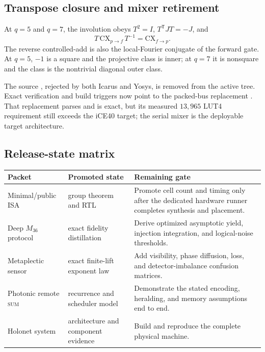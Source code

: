 \subsection{Transpose closure and mixer retirement}
At $q=5$ and $q=7$, the involution obeys $T^2=I$, $T^{\mathsf T}JT=-J$, and
\[
 T\,\mathrm{CX}_{p\to f}\,T^{-1}=\mathrm{CX}_{f\to p}.
\]
The reverse controlled-add is also the local-Fourier conjugate of the forward gate. At
$q=5$, $-1$ is a square and the projective class is inner; at $q=7$ it is nonsquare and
the class is the nontrivial diagonal outer class.

The source , rejected by both Icarus and Yosys, is removed
from the active tree. Exact verification and build triggers now point to the packed-bus
replacement . That replacement parses and
is exact, but its measured $13{,}965$ LUT4 requirement still exceeds the iCE40 target; the
serial mixer is the deployable target architecture.

\subsection{Release-state matrix}
\begin{center}
\begin{tabular}{@{}p{3.6cm}p{2.8cm}p{6.6cm}@{}}
\toprule
\textbf{Packet} & \textbf{Promoted state} & \textbf{Remaining gate}\\
\midrule
Minimal/public ISA & group theorem and RTL & Promote cell count and timing only after the
dedicated hardware runner completes synthesis and placement.\\
Deep $M_{36}$ protocol & exact fidelity distillation & Derive optimized asymptotic yield,
injection integration, and logical-noise thresholds.\\
Metaplectic sensor & exact finite-lift exponent law & Add visibility, phase diffusion,
loss, and detector-imbalance confusion matrices.\\
Photonic remote \textsc{sum} & recurrence and scheduler model & Demonstrate the stated
encoding, heralding, and memory assumptions end to end.\\
Holonet system & architecture and component evidence & Build and reproduce the complete
physical machine.\\
\bottomrule
\end{tabular}
\end{center}
